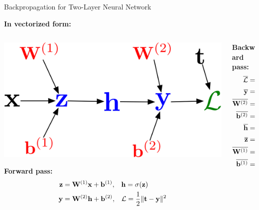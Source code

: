 \documentclass[handout,aspectratio=169]{beamer}
\begin{document}
\begin{frame}{Backpropagation for Two-Layer Neural Network}

  {\bf In vectorized form:}

  \vspace{1em}
  \begin{columns}
    \begin{column}{0.45 \linewidth}
    
\includegraphics[width=0.9 \linewidth]{pics/mlp_graph_vectorized.png}

      {\bf Forward pass:}
      \begin{align*}
        \mathbf{z} &= \mathbf{W}^{(1)} {\bf x} + \mathbf{b}^{(1)}, \;\;\;\mathbf{h} = \sigma(\mathbf{z}) \\
        \mathbf{y} &= \mathbf{W}^{(2)} \mathbf{h} + \mathbf{b}^{(2)},\;\;\;
        {\cal L} = \frac{1}{2} \| \mathbf{t} - \mathbf{y} \|^2
      \end{align*}     
    \end{column}

    \begin{column}{0.45 \linewidth}   
      {\bf Backward pass:}
      \begin{align*}
        \overline{{\cal L}} &= 1 \\
        \overline{\mathbf{y}} &= \overline{{\cal L}} \, (\mathbf{y} - \mathbf{t}) \\
        \overline{\mathbf{W}^{(2)}} &= \overline{\mathbf{y}} \mathbf{h}^\top \\
        \overline{\mathbf{b}^{(2)}} &= \overline{\mathbf{y}} \\
        \overline{\mathbf{h}} &= \mathbf{W}^{(2) \top} \overline{\mathbf{y}} \\
        \overline{\mathbf{z}} &= \overline{\mathbf{h}} \circ \sigma^\prime(\mathbf{z}) \\
        \overline{\mathbf{W}^{(1)}} &= \overline{\mathbf{z}} {\bf x}^\top \\
        \overline{\mathbf{b}^{(1)}} &= \overline{\mathbf{z}}
      \end{align*}
      
    \end{column}
  \end{columns}
\end{frame}
\end{document}
